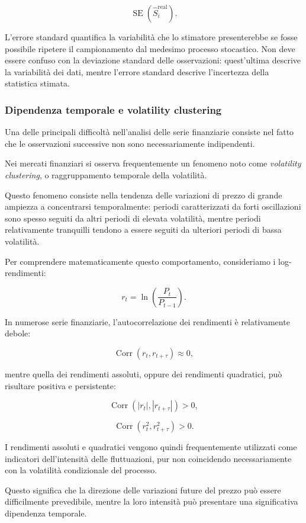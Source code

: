 \[
\operatorname{SE}\left(\widehat{S}_i^{\mathrm{real}}\right).
\]

L'errore standard quantifica la variabilità che lo stimatore presenterebbe
se fosse possibile ripetere il campionamento dal medesimo processo stocastico.
Non deve essere confuso con la deviazione standard delle osservazioni:
quest'ultima descrive la variabilità dei dati, mentre l'errore standard
descrive l'incertezza della statistica stimata.

\subsubsection{Dipendenza temporale e volatility clustering}

Una delle principali difficoltà nell'analisi delle serie finanziarie consiste
nel fatto che le osservazioni successive non sono necessariamente indipendenti.

Nei mercati finanziari si osserva frequentemente un fenomeno noto come
\textit{volatility clustering}, o raggruppamento temporale della volatilità.

Questo fenomeno consiste nella tendenza delle variazioni di prezzo di grande
ampiezza a concentrarsi temporalmente: periodi caratterizzati da forti
oscillazioni sono spesso seguiti da altri periodi di elevata volatilità,
mentre periodi relativamente tranquilli tendono a essere seguiti da ulteriori
periodi di bassa volatilità.

Per comprendere matematicamente questo comportamento, consideriamo i
log-rendimenti:

\[
r_t = \ln\left(\frac{P_t}{P_{t-1}}\right).
\]

In numerose serie finanziarie, l'autocorrelazione dei rendimenti è relativamente
debole:

\[
\operatorname{Corr}(r_t,r_{t+\tau}) \approx 0,
\]

mentre quella dei rendimenti assoluti, oppure dei rendimenti quadratici,
può risultare positiva e persistente:

\[
\operatorname{Corr}(|r_t|,|r_{t+\tau}|)>0,
\]

\[
\operatorname{Corr}(r_t^2,r_{t+\tau}^2)>0.
\]

I rendimenti assoluti e quadratici vengono quindi frequentemente utilizzati
come indicatori dell'intensità delle fluttuazioni, pur non coincidendo
necessariamente con la volatilità condizionale del processo.

Questo significa che la direzione delle variazioni future del prezzo può
essere difficilmente prevedibile, mentre la loro intensità può presentare
una significativa dipendenza temporale.

